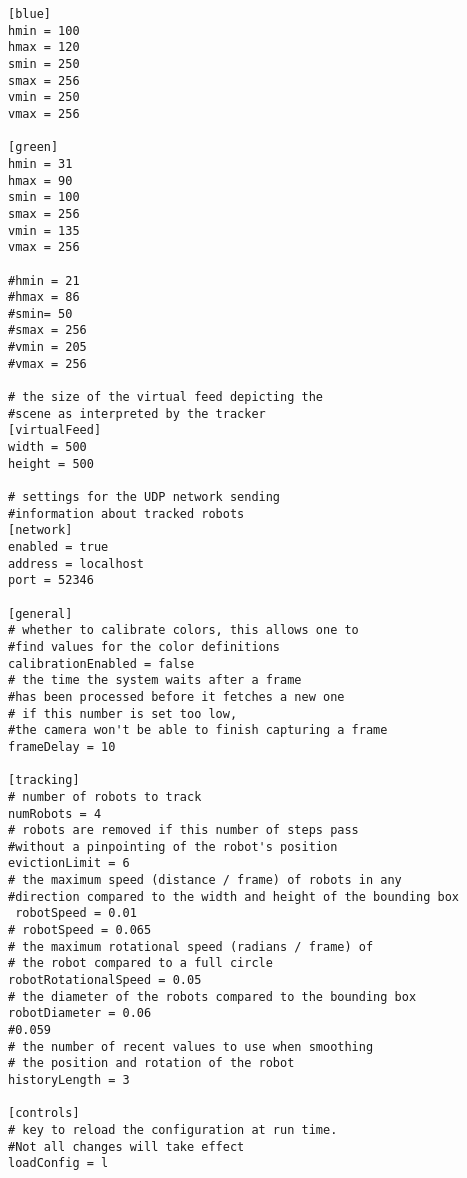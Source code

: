 \begin{lstlisting}
[blue]
hmin = 100
hmax = 120
smin = 250
smax = 256
vmin = 250
vmax = 256

[green]
hmin = 31
hmax = 90
smin = 100
smax = 256
vmin = 135
vmax = 256

#hmin = 21
#hmax = 86
#smin= 50
#smax = 256
#vmin = 205
#vmax = 256

# the size of the virtual feed depicting the 
#scene as interpreted by the tracker
[virtualFeed]
width = 500
height = 500
 
# settings for the UDP network sending 
#information about tracked robots
[network]
enabled = true 
address = localhost
port = 52346

[general]
# whether to calibrate colors, this allows one to 
#find values for the color definitions
calibrationEnabled = false
# the time the system waits after a frame 
#has been processed before it fetches a new one
# if this number is set too low, 
#the camera won't be able to finish capturing a frame
frameDelay = 10

[tracking]
# number of robots to track
numRobots = 4
# robots are removed if this number of steps pass 
#without a pinpointing of the robot's position
evictionLimit = 6
# the maximum speed (distance / frame) of robots in any 
#direction compared to the width and height of the bounding box
 robotSpeed = 0.01
# robotSpeed = 0.065
# the maximum rotational speed (radians / frame) of
# the robot compared to a full circle
robotRotationalSpeed = 0.05
# the diameter of the robots compared to the bounding box
robotDiameter = 0.06
#0.059
# the number of recent values to use when smoothing
# the position and rotation of the robot
historyLength = 3

[controls]
# key to reload the configuration at run time. 
#Not all changes will take effect
loadConfig = l
\end{lstlisting}